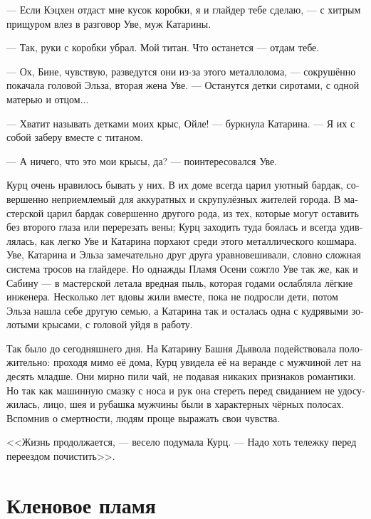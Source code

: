 \documentclass[a4paper,12pt,fleqn]{book}\usepackage{polyglossia}\setdefaultlanguage[babelshorthands=true]{russian}\setotherlanguage{english}\defaultfontfeatures{Ligatures=TeX,Mapping=tex-text}\usepackage{xcolor}\newcommand{\ml}[3]{#2}
\begin{document}
\ml{$0$}
{--- Если Кэцхен отдаст мне кусок коробки, я и глайдер тебе сделаю, --- с хитрым прищуром влез в разговор Уве, муж Катарины.}
{``If K\"{a}tzchen gives me a piece of the box, I'll make you a gleider on top of that,'' said Uwe, Katarina's husband.}

\ml{$0$}
{--- Так, руки с коробки убрал.}
{``Hands off the box.}
\ml{$0$}
{Мой титан.}
{My titanium.}
\ml{$0$}
{Что останется --- отдам тебе.}
{I'll give you what's left.''}

--- Ох, Бине, чувствую, разведутся они из-за этого металлолома, --- сокрушённо покачала головой Эльза, вторая жена Уве.
--- Останутся детки сиротами, с одной матерью и отцом...

--- Хватит называть детками моих крыс, Ойле! --- буркнула Катарина. %
--- Я их с собой заберу вместе с титаном.

--- А ничего, что это мои крысы, да? --- поинтересовался Уве.

Курц очень нравилось бывать у них.
В их доме всегда царил уютный бардак, совершенно неприемлемый для аккуратных и скрупулёзных жителей города.
В мастерской царил бардак совершенно другого рода, из тех, которые могут оставить без второго глаза или перерезать вены;
Курц заходить туда боялась и всегда удивлялась, как легко Уве и Катарина порхают среди этого металлического кошмара.
Уве, Катарина и Эльза замечательно друг друга уравновешивали, словно сложная система тросов на глайдере.
Но однажды Пламя Осени сожгло Уве так же, как и Сабину --- в мастерской летала вредная пыль, которая годами ослабляла лёгкие инженера.
Несколько лет вдовы жили вместе, пока не подросли дети, потом Эльза нашла себе другую семью, а Катарина так и осталась одна с кудрявыми золотыми крысами, с головой уйдя в работу.

Так было до сегодняшнего дня.
На Катарину Башня Дьявола подействовала положительно: проходя мимо её дома, Курц увидела её на веранде с мужчиной лет на десять младше.
Они мирно пили чай, не подавая никаких признаков романтики.
Но так как машинную смазку с носа и рук она стереть перед свиданием не удосужилась, лицо, шея и рубашка мужчины были в характерных чёрных полосах.
Вспомнив о смертности, людям проще выражать свои чувства.

<<Жизнь продолжается, --- весело подумала Курц.
--- Надо хоть тележку перед переездом почистить>>.

\section{Кленовое пламя}
\end{document}
